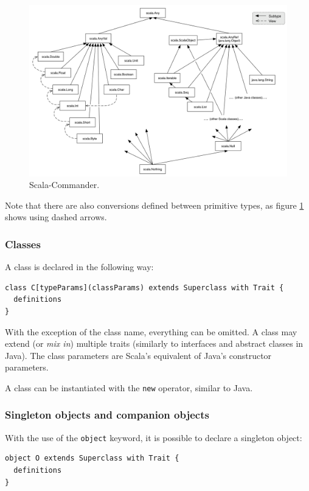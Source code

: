\begin{figure}[h!] 
  \centering
    \includegraphics[width=1\textwidth]{images/scala_type_hierarchy.png}
  \caption{Scala-Commander.}
  \label{fig:scala_type_hierarchy}  
\end{figure}

\noindent Note that there are also conversions defined between primitive types, as figure \ref{fig:scala_type_hierarchy} shows using dashed arrows.

\subsubsection{Classes}

A class is declared in the following way:

\begin{lstlisting}
class C[typeParams](classParams) extends Superclass with Trait {
  definitions
}
\end{lstlisting}

With the exception of the class name, everything can be omitted. A class may extend (or \emph{mix in}) multiple traits (similarly to interfaces and abstract classes in Java). The class parameters are Scala's equivalent of Java's constructor parameters.

A class can be instantiated with the \texttt{new} operator, similar to Java.

\subsubsection{Singleton objects and companion objects}

With the use of the \texttt{object} keyword, it is possible to declare a singleton object:
\begin{lstlisting}
object O extends Superclass with Trait {
  definitions
}
\end{lstlisting}

